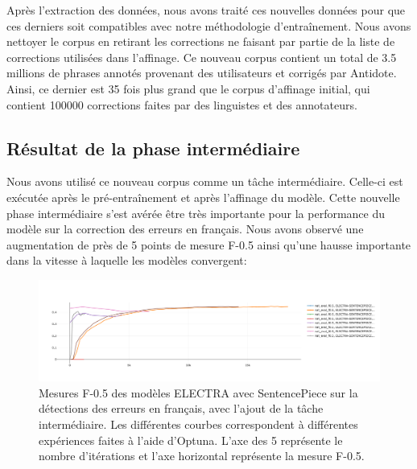\documentclass[12pt,twoside,maitrise]{dms}
\theoremstyle{definition}
\numberwithin{equation}{section}
\numberwithin{table}{chapter}
\numberwithin{figure}{chapter}
\begin{document}
Après l'extraction des données, nous avons traité ces nouvelles données pour
que ces derniers soit compatibles avec notre méthodologie d'entraînement. Nous
avons nettoyer le corpus en retirant les corrections ne faisant par partie de
la liste de corrections utilisées dans l'affinage. Ce nouveau corpus contient
un total de 3.5 millions de phrases annotés provenant des utilisateurs et
corrigés par Antidote. Ainsi, ce dernier est 35 fois plus grand que le corpus
d'affinage initial, qui contient 100000 corrections faites par des linguistes
et des annotateurs.
\subsection{Résultat de la phase intermédiaire}
Nous avons utilisé ce nouveau corpus comme un tâche intermédiaire. Celle-ci est
exécutée après le pré-entraînement et après l'affinage du modèle. Cette
nouvelle phase intermédiaire s'est avérée être très importante pour la
performance du modèle sur la correction des erreurs en français. Nous avons
observé une augmentation de près de 5 points de mesure F-0.5 ainsi qu'une
hausse importante dans la vitesse à laquelle les modèles convergent:

\begin{figure}
	\begin{center}
		\includegraphics[width=1.0\textwidth]{figures/electrasentencepieceawebf05optuna.png}
	\end{center}
	\caption{Mesures F-0.5 des modèles ELECTRA avec SentencePiece sur la détections des erreurs en français, avec l'ajout de la tâche intermédiaire. Les différentes courbes correspondent à différentes expériences faites à l'aide d'Optuna. L'axe des 5 représente le nombre d'itérations et l'axe horizontal représente la mesure F-0.5.}\label{fig:electraaweb}
\end{figure}
\end{document}
